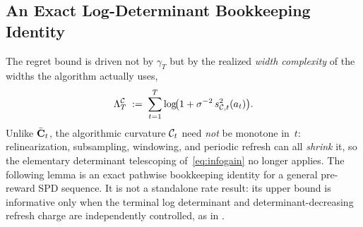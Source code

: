 \FloatBarrier %


\subsection{An Exact Log-Determinant Bookkeeping Identity}\label{sec:dynamic-potential}

The regret bound is driven not by $\gamma_T$ but by the realized
\emph{width complexity} of the widths the algorithm actually uses,
\begin{equation}\label{eq:lam-alg}
  \Lambda^{\mathcal{C}}_T \;:=\; \sum_{t=1}^T
  \log\!\bigl(1+\sigma^{-2}\,s_{\mathcal{C},t}^2(a_t)\bigr).
\end{equation}
Unlike $\bar{\mathbf{C}}_t$, the algorithmic curvature $\mathcal{C}_t$ need \emph{not} be
monotone in~$t$: relinearization, subsampling, windowing, and periodic
refresh can all \emph{shrink} it, so the elementary determinant
telescoping of~\eqref{eq:infogain} no longer applies.  The following lemma is an
exact pathwise bookkeeping identity for a general pre-reward SPD sequence.  It
is not a standalone rate result: its upper bound is informative only when the
terminal log determinant and determinant-decreasing refresh charge are
independently controlled, as in .

